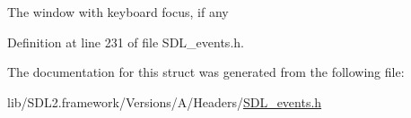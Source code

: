 The window with keyboard focus, if any 

Definition at line 231 of file S\+D\+L\+\_\+events.\+h.



The documentation for this struct was generated from the following file\+:\begin{DoxyCompactItemize}
\item 
lib/\+S\+D\+L2.\+framework/\+Versions/\+A/\+Headers/\mbox{\hyperlink{_s_d_l__events_8h}{S\+D\+L\+\_\+events.\+h}}\end{DoxyCompactItemize}
